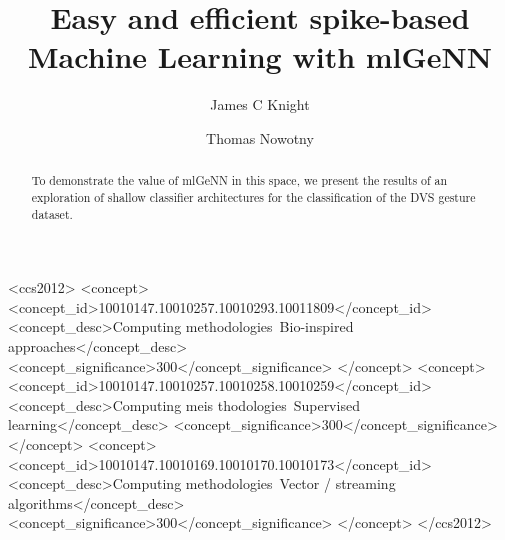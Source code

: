 \documentclass[sigconf]{acmart}
\begin{document}
\title{Easy and efficient spike-based Machine Learning with mlGeNN}

\author{James C Knight}

\author{Thomas Nowotny}
\renewcommand{\shortauthors}{Knight and Nowotny}

\begin{abstract}
    To demonstrate the value of mlGeNN in this space, we present the results of an exploration of shallow classifier architectures for the classification of the DVS gesture dataset. 
\end{abstract}

\begin{CCSXML}
<ccs2012>
   <concept>
       <concept_id>10010147.10010257.10010293.10011809</concept_id>
       <concept_desc>Computing methodologies~Bio-inspired approaches</concept_desc>
       <concept_significance>300</concept_significance>
       </concept>
   <concept>
       <concept_id>10010147.10010257.10010258.10010259</concept_id>
       <concept_desc>Computing meis thodologies~Supervised learning</concept_desc>
       <concept_significance>300</concept_significance>
       </concept>
   <concept>
       <concept_id>10010147.10010169.10010170.10010173</concept_id>
       <concept_desc>Computing methodologies~Vector / streaming algorithms</concept_desc>
       <concept_significance>300</concept_significance>
       </concept>
 </ccs2012>
\end{CCSXML}
\end{document}
